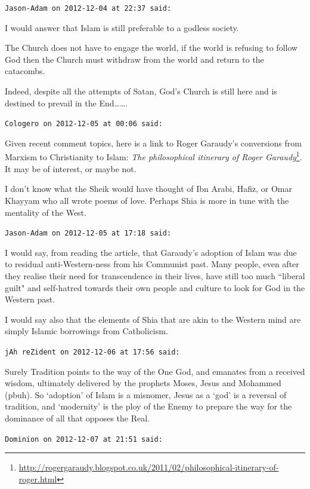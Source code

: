\begin{footnotesize}
\begin{sffamily}
\hfill

\texttt{Jason-Adam on 2012-12-04 at 22:37 said: }

I would answer that Islam is still preferable to a godless society.

The Church does not have to engage the world, if the world is refusing to follow God then the Church must withdraw from the world and return to the catacombs.

Indeed, despite all the attempts of Satan, God's Church is still here and is destined to prevail in the End…….


\hfill

\texttt{Cologero on 2012-12-05 at 00:06 said: }

Given recent comment topics, here is a link to Roger Garaudy's conversions from Marxism to Christianity to Islam: \textit{The philosophical itinerary of Roger Garaudy}\footnote{\url{http://rogergaraudy.blogspot.co.uk/2011/02/philosophical-itinerary-of-roger.html}}. It may be of interest, or maybe not.

I don't know what the Sheik would have thought of Ibn Arabi, Hafiz, or Omar Khayyam who all wrote poems of love. Perhaps Shia is more in tune with the mentality of the West.


\hfill

\texttt{Jason-Adam on 2012-12-05 at 17:18 said: }

I would say, from reading the article, that Garaudy's adoption of Islam was due to residual anti-Western-ness from his Communist past. Many people, even after they realise their need for transcendence in their lives, have still too much ``liberal guilt" and self-hatred towards their own people and culture to look for God in the Western past.

I would say also that the elements of Shia that are akin to the Western mind are simply Islamic borrowings from Catholicism.


\hfill

\texttt{jAh reZident on 2012-12-06 at 17:56 said: }

Surely Tradition points to the way of the One God, and emanates from a received wisdom, ultimately delivered by the prophets Moses, Jesus and Mohammed (pbuh). So `adoption' of Islam is a misnomer, Jesus as a `god' is a reversal of tradition, and `modernity' is the ploy of the Enemy to prepare the way for the dominance of all that opposes the Real.


\hfill

\texttt{Dominion on 2012-12-07 at 21:51 said: }


\end{sffamily}
\end{footnotesize}

